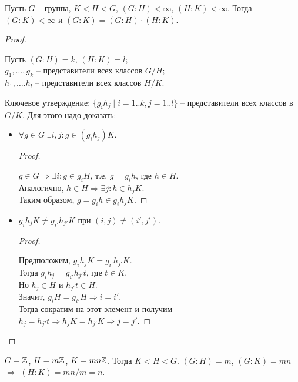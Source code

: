 \begin{theorem}
    Пусть $G$ -- группа, $K < H < G$, $(G : H) < \infty$,
    $(H : K) < \infty$. Тогда $(G : K) < \infty$ и
    $(G : K) = (G : H) \cdot (H : K)$.
\end{theorem}
\begin{proof} $ $

    Пусть $(G : H) = k$, $(H : K) = l$; \\
    $g_1, \dots, g_k$ -- представители всех классов $G/H$; \\
    $h_1, \dots. h_l$ -- представители всех классов $H/K$.

    Ключевое утверждение: $\{ g_i h_j \mid i = 1..k, j = 1..l \}$
    -- представители всех классов в $G/K$. Для этого надо
    доказать:
    \begin{itemize}
        \item $\forall g \in G \; \exists i, j : g \in (g_i h_j) K$.
        \begin{proof} $ $

            $g \in G \Rightarrow \exists i : g \in g_i H$,
            т.е. $g = g_i h$, где $h \in H$. \\
            Аналогично, $h \in H \Rightarrow \exists j : h \in h_j K$.\\
            Таким образом, $g = g_i h \in g_i h_j K$.
        \end{proof}
        \item $g_i h_j K \neq g_{i'} h_{j'} K$ при 
        $(i, j) \neq (i', j')$.
        \begin{proof} $ $

            Предположим, $g_i h_j K = g_{i'} h_{j'} K$. \\
            Тогда $g_i h_j = g_{i'} h_{j'} t$, где $t \in K$. \\
            Но $h_j \in H$ и $h_{j'} t \in H$. \\ 
            Значит, $g_i H = g_{i'} H \Rightarrow i = i'$. \\
            Тогда сократим
            на этот элемент и получим \\ $h_j = h_{j'} t
            \Rightarrow h_j K = h_{j'} K \Rightarrow j = j'$.
        \end{proof}
    \end{itemize}
\end{proof}

\begin{example}
    $G = \mathbb{Z}$, $H = m\mathbb{Z}$, $K = mn\mathbb{Z}$. Тогда $K < H < G$.
    $(G : H) = m$, $(G : K) = mn$ $\Rightarrow$ $(H : K) = mn/m = n$.
\end{example}

